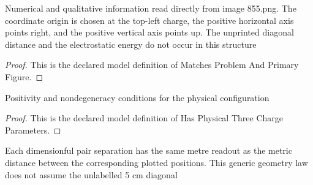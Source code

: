 \begin{definition}
  \label{def:physics:phyx-mini-0855:phyxminiproblems-problemphyxmini0855-matchesproblemandprimaryfigure}
  Numerical and qualitative information read directly from image 855.png. The coordinate origin is chosen at the top-left charge, the positive horizontal axis points right, and the positive vertical axis points up. The unprinted diagonal distance and the electrostatic energy do not occur in this structure
\end{definition}
\begin{proof}
  This is the declared model definition of Matches Problem And Primary Figure.
\end{proof}
\begin{definition}
  \label{def:physics:phyx-mini-0855:phyxminiproblems-problemphyxmini0855-hasphysicalthreechargeparameters}
  Positivity and nondegeneracy conditions for the physical configuration
\end{definition}
\begin{proof}
  This is the declared model definition of Has Physical Three Charge Parameters.
\end{proof}
\begin{definition}
  \label{def:physics:phyx-mini-0855:phyxminiproblems-problemphyxmini0855-satisfiesdepictedseparationgeometry}
  Each dimensionful pair separation has the same metre readout as the metric distance between the corresponding plotted positions. This generic geometry law does not assume the unlabelled 5 cm diagonal
\end{definition}
